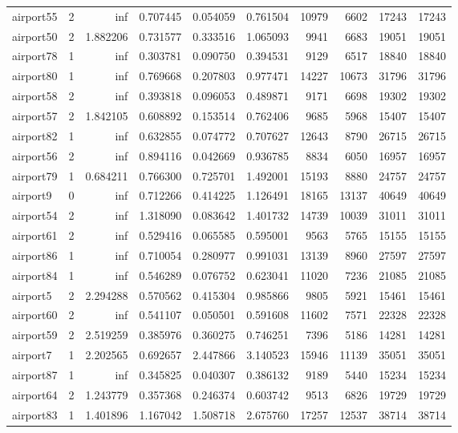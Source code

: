 \begin{longtable}{|l|r|r|r|r|r|r|r|r|r|}
airport55 & 2 & inf & 0.707445 & 0.054059 & 0.761504 & 10979 & 6602 & 17243 & 17243 \\
airport50 & 2 & 1.882206 & 0.731577 & 0.333516 & 1.065093 & 9941 & 6683 & 19051 & 19051 \\
airport78 & 1 & inf & 0.303781 & 0.090750 & 0.394531 & 9129 & 6517 & 18840 & 18840 \\
airport80 & 1 & inf & 0.769668 & 0.207803 & 0.977471 & 14227 & 10673 & 31796 & 31796 \\
airport58 & 2 & inf & 0.393818 & 0.096053 & 0.489871 & 9171 & 6698 & 19302 & 19302 \\
airport57 & 2 & 1.842105 & 0.608892 & 0.153514 & 0.762406 & 9685 & 5968 & 15407 & 15407 \\
airport82 & 1 & inf & 0.632855 & 0.074772 & 0.707627 & 12643 & 8790 & 26715 & 26715 \\
airport56 & 2 & inf & 0.894116 & 0.042669 & 0.936785 & 8834 & 6050 & 16957 & 16957 \\
airport79 & 1 & 0.684211 & 0.766300 & 0.725701 & 1.492001 & 15193 & 8880 & 24757 & 24757 \\
airport9 & 0 & inf & 0.712266 & 0.414225 & 1.126491 & 18165 & 13137 & 40649 & 40649 \\
airport54 & 2 & inf & 1.318090 & 0.083642 & 1.401732 & 14739 & 10039 & 31011 & 31011 \\
airport61 & 2 & inf & 0.529416 & 0.065585 & 0.595001 & 9563 & 5765 & 15155 & 15155 \\
airport86 & 1 & inf & 0.710054 & 0.280977 & 0.991031 & 13139 & 8960 & 27597 & 27597 \\
airport84 & 1 & inf & 0.546289 & 0.076752 & 0.623041 & 11020 & 7236 & 21085 & 21085 \\
airport5 & 2 & 2.294288 & 0.570562 & 0.415304 & 0.985866 & 9805 & 5921 & 15461 & 15461 \\
airport60 & 2 & inf & 0.541107 & 0.050501 & 0.591608 & 11602 & 7571 & 22328 & 22328 \\
airport59 & 2 & 2.519259 & 0.385976 & 0.360275 & 0.746251 & 7396 & 5186 & 14281 & 14281 \\
airport7 & 1 & 2.202565 & 0.692657 & 2.447866 & 3.140523 & 15946 & 11139 & 35051 & 35051 \\
airport87 & 1 & inf & 0.345825 & 0.040307 & 0.386132 & 9189 & 5440 & 15234 & 15234 \\
airport64 & 2 & 1.243779 & 0.357368 & 0.246374 & 0.603742 & 9513 & 6826 & 19729 & 19729 \\
airport83 & 1 & 1.401896 & 1.167042 & 1.508718 & 2.675760 & 17257 & 12537 & 38714 & 38714 \\

\end{longtable}
